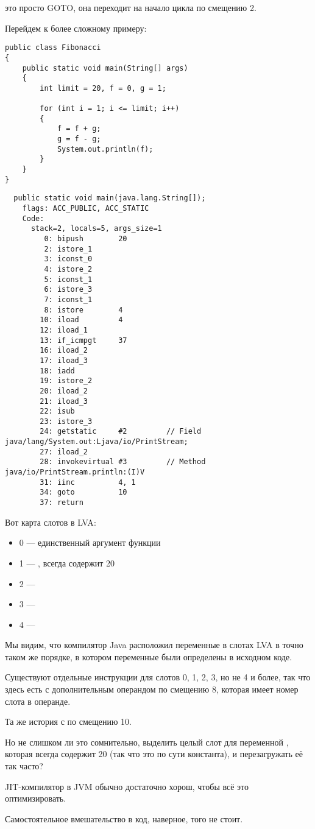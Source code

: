  это просто GOTO, она переходит на начало цикла по смещению 2.


Перейдем к более сложному примеру:

\begin{lstlisting}[style=customjava]
public class Fibonacci
{
	public static void main(String[] args)
	{ 
		int limit = 20, f = 0, g = 1;

		for (int i = 1; i <= limit; i++)
		{
			f = f + g;
			g = f - g;
			System.out.println(f); 
		}
	}
}
\end{lstlisting}

\begin{lstlisting}
  public static void main(java.lang.String[]);
    flags: ACC_PUBLIC, ACC_STATIC
    Code:
      stack=2, locals=5, args_size=1
         0: bipush        20
         2: istore_1      
         3: iconst_0      
         4: istore_2      
         5: iconst_1      
         6: istore_3      
         7: iconst_1      
         8: istore        4
        10: iload         4
        12: iload_1       
        13: if_icmpgt     37
        16: iload_2       
        17: iload_3       
        18: iadd          
        19: istore_2      
        20: iload_2       
        21: iload_3       
        22: isub          
        23: istore_3      
        24: getstatic     #2         // Field java/lang/System.out:Ljava/io/PrintStream;
        27: iload_2       
        28: invokevirtual #3         // Method java/io/PrintStream.println:(I)V
        31: iinc          4, 1
        34: goto          10
        37: return        
\end{lstlisting}
        

Вот карта слотов в \ac{LVA}:

\begin{itemize}
\item 0 --- единственный аргумент функции \main
\item 1 --- , всегда содержит 20
\item 2 --- 
\item 3 --- 
\item 4 --- 
\end{itemize}


Мы видим, что компилятор Java расположил переменные в слотах \ac{LVA} в точно таком же порядке,
в котором переменные были определены в исходном коде.


Существуют отдельные инструкции  для слотов 0, 1, 2, 3, но не 4 и более, 
так что здесь есть  с дополнительным операндом по смещению 8, 
которая имеет номер слота в операнде.

Та же история с  по смещению 10.


Но не слишком ли это сомнительно, выделить целый слот для переменной ,
которая всегда содержит 20 (так что это по сути константа), и перезагружать её так часто?

\ac{JIT}-компилятор в \ac{JVM} обычно достаточно хорош, чтобы всё это оптимизировать.

Самостоятельное вмешательство в код, наверное, того не стоит.

